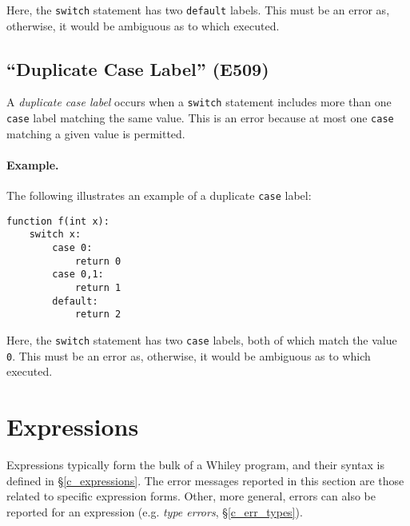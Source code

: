 Here, the \lstinline{switch} statement has two \lstinline{default} labels.  This must be an error as, otherwise, it would be ambiguous as to which executed.

\subsection{``Duplicate Case Label'' (E509)}
A {\em duplicate case label} occurs when a \lstinline{switch} statement includes more than one \lstinline{case} label matching the same value.  This is an error because at most one \lstinline{case} matching a given value is permitted.

\paragraph{Example.}  The following illustrates an example of a duplicate \lstinline{case} label:

\begin{lstlisting}
function f(int x):
    switch x:
        case 0:
            return 0
        case 0,1:
            return 1
        default:
            return 2
\end{lstlisting}

Here, the \lstinline{switch} statement has two \lstinline{case} labels, both of which match the value \lstinline{0}.  This must be an error as, otherwise, it would be ambiguous as to which executed.


\section{Expressions}




Expressions typically form the bulk of a Whiley program, and their syntax is defined in \S\ref{c_expressions}.  The error messages reported in this section are those related to specific expression forms.  Other, more general, errors can also be reported for an expression (e.g. {\em type errors}, \S\ref{c_err_types}).

